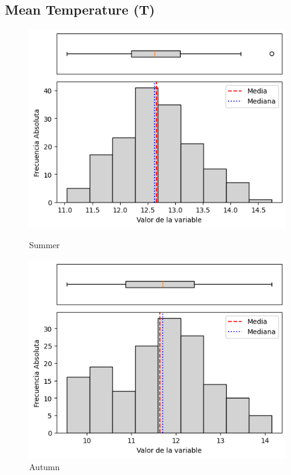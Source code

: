 \subsection{Mean Temperature (T)}

\begin{figure}[htbp]
\centering
\begin{minipage}{0.30\textwidth}
  \includegraphics[width=\linewidth]{resultados/por_estacion_del_anio/boxplot_clases_por_estacion/Ancachuro/T_HistBoxplot_Summer.png}
  \caption*{Summer}
\end{minipage}
\hfill
\begin{minipage}{0.30\textwidth}
  \includegraphics[width=\linewidth]{resultados/por_estacion_del_anio/boxplot_clases_por_estacion/Ancachuro/T_HistBoxplot_Autumn.png}
  \caption*{Autumn}
\end{minipage}


\end{figure}
